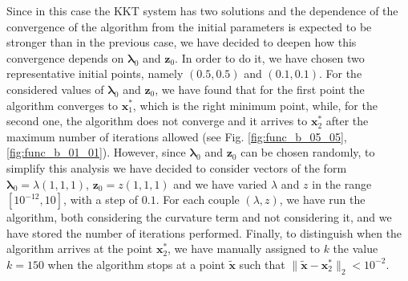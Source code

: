 \documentclass[a4paper,11pt]{article}
\begin{document}
\noindent Since in this case the KKT system has two solutions and the dependence of the convergence of the algorithm from the initial parameters is expected to be stronger than in the previous case, we have decided to deepen how this convergence depends on $\boldsymbol{\lambda}_{0}$ and $\textbf{z}_{0}$.
In order to do it, we have chosen two representative initial points, namely $(0.5,0.5)$ and $(0.1,0.1)$.
For the considered values of $\boldsymbol{\lambda}_{0}$ and $\textbf{z}_{0}$, we have found that for the first point the algorithm converges to $\textbf{x}_{1}^*$, which is the right minimum point, while, for the second one, the algorithm does not converge and it arrives to $\textbf{x}_{2}^*$ after the maximum number of iterations allowed (see Fig. \ref{fig:func_b_05_05}, \ref{fig:func_b_01_01}). However, since $\boldsymbol{\lambda}_{0}$ and $\textbf{z}_{0}$ can be chosen randomly, to simplify this analysis we have decided to consider vectors of the form $\boldsymbol{\lambda}_{0}=\lambda(1,1,1)$, $\textbf{z}_{0}=z(1,1,1)$ and we have varied $\lambda$ and $z$ in the range $[10^{-12},10]$, with a step of $0.1$. For each couple $(\lambda,z)$, we have run the algorithm, both considering the curvature term and not considering it, and we have stored the number of iterations performed.
%
Finally, to distinguish when the algorithm arrives at the point $\textbf{x}_{2}^*$, we have manually assigned to $k$ the value $k=150$ when the algorithm stops at a point $\tilde{\textbf{x}}$ such that $\| \tilde{\textbf{x}} - \textbf{x}_{2}^*  \|_{2} < 10^{-2}$.\\
\end{document}
